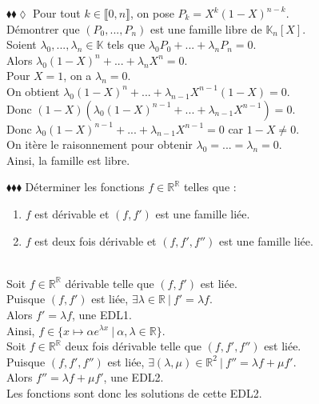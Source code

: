 \documentclass[11pt]{article}
\newcommand*{\R}{\mathbb{R}}
\newcommand*{\K}{\mathbb{K}}
\begin{document}
\begin{exercise}{$\blacklozenge\blacklozenge\lozenge$}{}
    Pour tout $k \in \llbracket 0, n \rrbracket$, on pose $P_k = X^k(1-X)^{n-k}$.\\
    Démontrer que $(P_0, ..., P_n)$ est une famille libre de $\K_n[X]$.
    \tcblower\\[0.2cm]
    Soient $\lambda_0, ..., \lambda_n \in \K$ tels que $\lambda_0P_0 + ... + \lambda_nP_n = 0$.\\ 
    Alors $\lambda_0(1-X)^n + ... + \lambda_nX^n = 0$.\\
    Pour $X = 1$, on a $\lambda_n = 0$.\\
    On obtient $\lambda_0(1-X)^n + ... + \lambda_{n-1}X^{n-1}(1-X) = 0$.\\
    Donc $(1-X)\left(\lambda_0(1-X)^{n-1} + ... + \lambda_{n-1}X^{n-1}\right) = 0$.\\
    Donc $\lambda_0(1-X)^{n-1} + ... + \lambda_{n-1}X^{n-1} = 0$ car $1-X \neq 0$.\\
    On itère le raisonnement pour obtenir $\lambda_0 = ... = \lambda_{n} = 0$.\\
    Ainsi, la famille est libre.
\end{exercise}

\begin{exercise}{$\blacklozenge\blacklozenge\blacklozenge$}{}
    Déterminer les fonctions $f\in\R^\R$ telles que :
    \begin{enumerate}[topsep=0pt,itemsep=-0.9ex]
        \item $f$ est dérivable et $(f,f')$ est une famille liée.
        \item $f$ est deux fois dérivable et $(f, f', f'')$ est une famille liée.
    \end{enumerate}
    \tcblower\\[0.2cm]
     Soit $f\in\R^\R$ dérivable telle que $(f, f')$ est liée.\\
    Puisque $(f,f')$ est liée, $\exists \lambda \in \R ~ | ~ f' = \lambda f$.\\
    Alors $f' = \lambda f$, une EDL1.\\
    Ainsi, $f \in \{x \mapsto \alpha e^{\lambda x} ~ | ~ \alpha, \lambda \in \R\}$.\\[0.3cm]
     Soit $f\in\R^\R$ deux fois dérivable telle que $(f, f', f'')$ est liée.\\
    Puisque $(f, f', f'')$ est liée, $\exists (\lambda, \mu) \in \R^2 ~ | ~ f'' = \lambda f + \mu f'$.\\
    Alors $f'' = \lambda f + \mu f'$, une EDL2.\\
    Les fonctions sont donc les solutions de cette EDL2.
\end{exercise}
\end{document}
